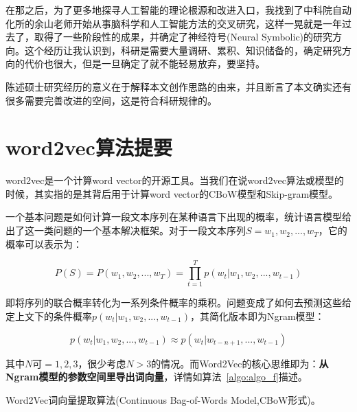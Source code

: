 在那之后，为了更多地探寻人工智能的理论根源和改进入口，我找到了中科院自动化所的余山老师开始从事脑科学和人工智能方法的交叉研究，这样一晃就是一年过去了，取得了一些阶段性的成果，并确定了神经符号(Neural Symbolic)的研究方向。这个经历让我认识到，科研是需要大量调研、累积、知识储备的，确定研究方向的代价也很大，但是一旦确定了就不能轻易放弃，要坚持。

陈述硕士研究经历的意义在于解释本文创作思路的由来，并且断言了本文确实还有很多需要完善改进的空间，这是符合科研规律的。

\section{word2vec算法提要}
word2vec是一个计算word vector的开源工具。当我们在说word2vec算法或模型的时候，其实指的是其背后用于计算word vector的CBoW模型和Skip-gram模型。

一个基本问题是如何计算一段文本序列在某种语言下出现的概率，统计语言模型给出了这一类问题的一个基本解决框架。对于一段文本序列$S=w_1, w_2, ... , w_T$，它的概率可以表示为：

$$P(S)=P(w_1, w_2, ..., w_T)=\prod_{t=1}^Tp(w_t|w_1, w_2, ..., w_{t-1})$$

即将序列的联合概率转化为一系列条件概率的乘积。问题变成了如何去预测这些给定上文下的条件概率$p(w_t|w_1,w_2,...,w_{t-1})$，其简化版本即为Ngram模型：

$$p(w_t|w_1, w_2, ..., w_{t-1}) \approx p(w_t|w_{t-n+1}, ..., w_{t-1})$$

其中$N$可$=1,2,3$，很少考虑$N>3$的情况。而Word2Vec的核心思维即为：\textbf{从Ngram模型的参数空间里导出词向量}，详情如算法~\ref{algo:algo_f}描述。


\begin{algorithm}[htbp]
\SetAlgoLined
{}

\caption{Word2Vec词向量提取算法(Continuous Bag-of-Words Model,CBoW形式)。}
\label{algo:algo_f}
\end{algorithm}


